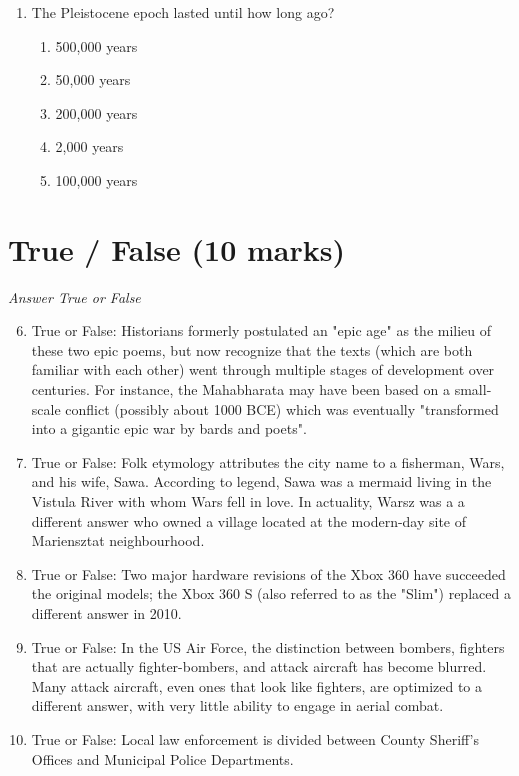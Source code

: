 \documentclass[12pt]{article}
\begin{document}
\begin{enumerate}[label=\arabic*.]
\begin{enumerate}[label=(\alph*)]
    \item 17 th century.
    \item 14 th century.
    \item 18 th century.
    \item 21 st century.
    \item 5 th century.
\end{enumerate}
\item The Pleistocene epoch lasted until how long ago?
\begin{enumerate}[label=(\alph*)]
    \item 500,000 years
    \item 50,000 years
    \item 200,000 years
    \item 2,000 years
    \item 100,000 years
\end{enumerate}
\end{enumerate}

\section*{True / False (10 marks)}
\textit{Answer True or False}
\begin{enumerate}[label=\arabic*.]
\setcounter{enumi}{5}
\item True or False: Historians formerly postulated an "epic age" as the milieu of these two epic poems, but now recognize that the texts (which are both familiar with each other) went through multiple stages of development over centuries. For instance, the Mahabharata may have been based on a small-scale conflict (possibly about 1000 BCE) which was eventually "transformed into a gigantic epic war by bards and poets".
\item True or False: Folk etymology attributes the city name to a fisherman, Wars, and his wife, Sawa. According to legend, Sawa was a mermaid living in the Vistula River with whom Wars fell in love. In actuality, Warsz was a a different answer who owned a village located at the modern-day site of Mariensztat neighbourhood.
\item True or False: Two major hardware revisions of the Xbox 360 have succeeded the original models; the Xbox 360 S (also referred to as the "Slim") replaced a different answer in 2010.
\item True or False: In the US Air Force, the distinction between bombers, fighters that are actually fighter-bombers, and attack aircraft has become blurred. Many attack aircraft, even ones that look like fighters, are optimized to a different answer, with very little ability to engage in aerial combat.
\item True or False: Local law enforcement is divided between County Sheriff's Offices and Municipal Police Departments.
\end{enumerate}
\end{document}
